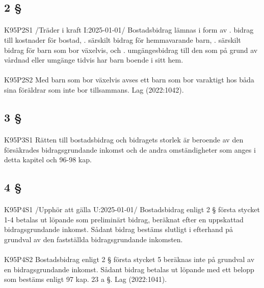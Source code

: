 \documentclass[a4paper,notitlepage,openany,10pt]{book}
\begin{document}
\subsection*{2 §}
\paragraph*{}
{\tiny K95P2S1}
/Träder i kraft I:2025-01-01/
Bostadsbidrag lämnas i form av
. bidrag till kostnader för bostad,
. särskilt bidrag för hemmavarande barn,
. särskilt bidrag för barn som bor växelvis, och
. umgängesbidrag till den som på grund av vårdnad eller umgänge tidvis har barn boende i sitt hem.
\paragraph*{}
{\tiny K95P2S2}
Med barn som bor växelvis avses ett barn som bor varaktigt hos båda sina föräldrar som inte bor tillsammans.
Lag (2022:1042).
\subsection*{3 §}
\paragraph*{}
{\tiny K95P3S1}
Rätten till bostadsbidrag och bidragets storlek är beroende av den försäkrades bidragsgrundande inkomst och de andra omständigheter som anges i detta kapitel och 96-98 kap.
\subsection*{4 §}
\paragraph*{}
{\tiny K95P4S1}
/Upphör att gälla U:2025-01-01/
Bostadsbidrag enligt 2 § första stycket 1-4 betalas ut löpande som preliminärt bidrag, beräknat efter en uppskattad bidragsgrundande inkomst. Sådant bidrag bestäms slutligt i efterhand på grundval av den fastställda bidragsgrundande inkomsten.
\paragraph*{}
{\tiny K95P4S2}
Bostadsbidrag enligt 2 § första stycket 5 beräknas inte på grundval av en bidragsgrundande inkomst. Sådant bidrag betalas ut löpande med ett belopp som bestäms enligt 97 kap. 23 a §.
Lag (2022:1041).
\end{document}
